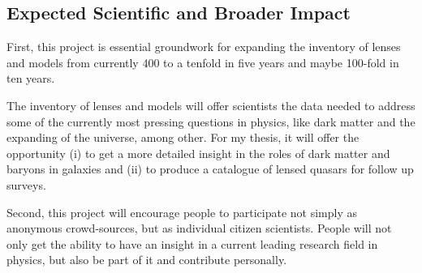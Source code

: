 \documentclass[11pt]{article}
\begin{document}
\subsection{Expected Scientific and Broader Impact}

First, this project is essential groundwork for expanding the inventory of lenses and models from currently 400 to a tenfold in five years and maybe 100-fold in ten years.

The inventory of lenses and models will offer scientists the data needed to address some of the currently most pressing questions in physics, like dark matter and the expanding of the universe, among other.
For my thesis, it will offer the opportunity (i) to get a more detailed insight in the roles of dark matter and baryons in galaxies and (ii) to produce a catalogue of lensed quasars for follow up surveys.



Second, this project will encourage people to participate not simply as anonymous crowd-sources, but as individual citizen scientists.
People will not only get the ability to have an insight in a current leading research field in physics, but also be part of it and contribute personally.


\newpage


\end{document}
